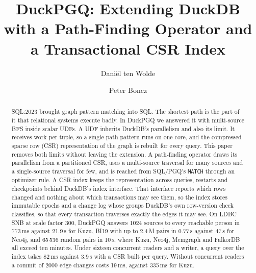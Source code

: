\documentclass[sigconf, nonacm]{acmart}
\newcommand{\duckpgq}{DuckPGQ\xspace}
\newcommand{\duckdb}{DuckDB\xspace}
\newcommand{\sqlpgq}{SQL/PGQ\xspace}
\begin{document}
\title{DuckPGQ: Extending DuckDB with a Path-Finding Operator and a Transactional CSR Index}

\author{Dani\"el ten Wolde}

\author{Peter Boncz}

\begin{abstract}
SQL:2023 brought graph pattern matching into SQL. The shortest path is the part of it that relational systems
execute badly. In \duckpgq we answered it with multi-source BFS inside scalar UDFs. A UDF inherits \duckdb's
parallelism and also its limit. It receives work per tuple, so a single path pattern runs on one core, and the
compressed sparse row (CSR) representation of the graph is rebuilt for every query. This paper removes both limits
without leaving the extension. A path-finding operator draws its parallelism from a partitioned CSR, uses a
multi-source traversal for many sources and a single-source traversal for few, and is reached from \sqlpgq's
\texttt{MATCH} through an optimizer rule. A CSR index keeps the representation across queries, restarts and
checkpoints behind \duckdb's index interface. That interface reports which rows changed and nothing about which
transactions may see them, so the index stores immutable epochs and a change log whose groups \duckdb's own row-version check
classifies, so that every transaction traverses exactly the edges it may see. On LDBC SNB at scale
factor 300, \duckpgq answers 1024 sources to every reachable person in 773\,ms against 21.9\,s for Kuzu, BI19 with up
to 2.4\,M pairs in 0.77\,s against 47\,s for Neo4j, and 65\,536 random pairs in 10\,s, where Kuzu, Neo4j, Memgraph
and FalkorDB all exceed ten minutes. Under sixteen concurrent readers and a writer, a query over the index takes
82\,ms against 3.9\,s with a CSR built per query. Without concurrent readers a commit of 2000 edge changes costs 19\,ms, against 335\,ms for Kuzu.
\end{abstract}

\maketitle
\end{document}
